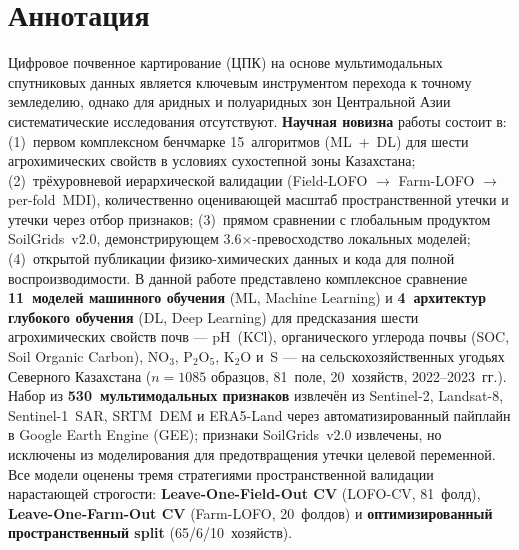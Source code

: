 \section*{Аннотация}

\noindent
Цифровое почвенное картирование (ЦПК) на основе мультимодальных спутниковых данных является ключевым инструментом перехода к точному земледелию, однако для аридных и полуаридных зон Центральной Азии систематические исследования отсутствуют.
\textbf{Научная новизна} работы состоит в: (1)~первом комплексном бенчмарке 15~алгоритмов (ML~+~DL) для шести агрохимических свойств в условиях сухостепной зоны Казахстана; (2)~трёхуровневой иерархической валидации (Field-LOFO $\to$ Farm-LOFO $\to$ per-fold~MDI), количественно оценивающей масштаб пространственной утечки и утечки через отбор признаков; (3)~прямом сравнении с глобальным продуктом SoilGrids~v2.0, демонстрирующем 3.6$\times$-превосходство локальных моделей; (4)~открытой публикации физико-химических данных и кода для полной воспроизводимости.
В данной работе представлено комплексное сравнение \textbf{11~моделей машинного обучения} (ML, Machine Learning) и \textbf{4~архитектур глубокого обучения} (DL, Deep Learning) для предсказания шести агрохимических свойств почв --- pH~(KCl), органического углерода почвы (SOC, Soil Organic Carbon), NO$_3$, P$_2$O$_5$, K$_2$O и~S --- на сельскохозяйственных угодьях Северного Казахстана ($n = 1085$ образцов, 81~поле, 20~хозяйств, 2022--2023~гг.).
Набор из \textbf{530~мультимодальных признаков} извлечён из Sentinel-2, Landsat-8, Sentinel-1~SAR, SRTM~DEM и ERA5-Land через автоматизированный пайплайн в Google Earth Engine (GEE); признаки SoilGrids~v2.0 извлечены, но исключены из моделирования для предотвращения утечки целевой переменной.
Все модели оценены тремя стратегиями пространственной валидации нарастающей строгости: \textbf{Leave-One-Field-Out CV} (LOFO-CV, 81~фолд), \textbf{Leave-One-Farm-Out CV} (Farm-LOFO, 20~фолдов) и \textbf{оптимизированный пространственный split} (65/6/10~хозяйств).

